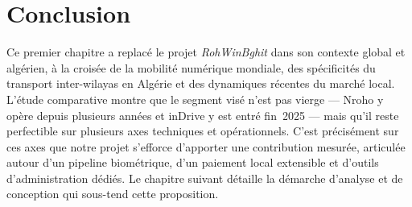 \section*{Conclusion}

Ce premier chapitre a replacé le projet \textit{RohWinBghit} dans son contexte global et algérien, à la croisée de la mobilité numérique mondiale, des spécificités du transport inter-wilayas en Algérie et des dynamiques récentes du marché local. L'étude comparative montre que le segment visé n'est pas vierge --- Nroho y opère depuis plusieurs années et inDrive y est entré fin~2025 --- mais qu'il reste perfectible sur plusieurs axes techniques et opérationnels. C'est précisément sur ces axes que notre projet s'efforce d'apporter une contribution mesurée, articulée autour d'un pipeline biométrique, d'un paiement local extensible et d'outils d'administration dédiés. Le chapitre suivant détaille la démarche d'analyse et de conception qui sous-tend cette proposition.
